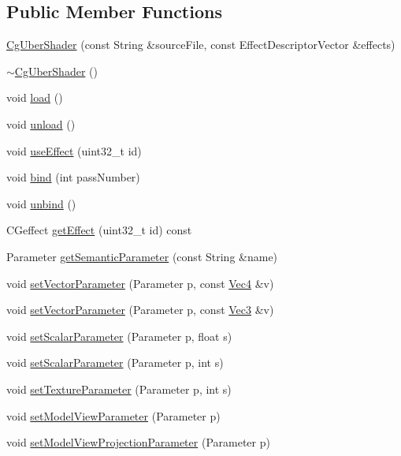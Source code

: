 \subsection*{\-Public \-Member \-Functions}
\begin{DoxyCompactItemize}
\item 
\hyperlink{class_verdi_1_1_cg_uber_shader_a5e966004208914c321d13682dbf46e7f}{\-Cg\-Uber\-Shader} (const \-String \&source\-File, const \-Effect\-Descriptor\-Vector \&effects)
\item 
\hyperlink{class_verdi_1_1_cg_uber_shader_a5a017eafea523d5d8a9d367590eca6c9}{$\sim$\-Cg\-Uber\-Shader} ()
\item 
void \hyperlink{class_verdi_1_1_cg_uber_shader_a6b645a552cac4f146317e952e63a6983}{load} ()
\item 
void \hyperlink{class_verdi_1_1_cg_uber_shader_a7c9cb2b6be590a8ba8403966c18c0224}{unload} ()
\item 
void \hyperlink{class_verdi_1_1_cg_uber_shader_a6d6ce6cfd0ac5184d3080d28e6acee5a}{use\-Effect} (uint32\-\_\-t id)
\item 
void \hyperlink{class_verdi_1_1_cg_uber_shader_a0fcb4b251642e47d9cddf8b953077ca9}{bind} (int pass\-Number)
\item 
void \hyperlink{class_verdi_1_1_cg_uber_shader_a59c11b258e21b727b1f9c1f97a82d92d}{unbind} ()
\item 
\-C\-Geffect \hyperlink{class_verdi_1_1_cg_uber_shader_a00bc3ed3a3a2487e98d2ed4a870c71d1}{get\-Effect} (uint32\-\_\-t id) const 
\item 
\-Parameter \hyperlink{class_verdi_1_1_cg_uber_shader_acb88799a32d8ffb579394672ca5476e9}{get\-Semantic\-Parameter} (const \-String \&name)
\item 
void \hyperlink{class_verdi_1_1_cg_uber_shader_a5f26603c60f105b32b29c459fbded251}{set\-Vector\-Parameter} (\-Parameter p, const \hyperlink{class_verdi_1_1_vec4}{\-Vec4} \&v)
\item 
void \hyperlink{class_verdi_1_1_cg_uber_shader_acb5142e56a6cc919560bcd847f3fceb9}{set\-Vector\-Parameter} (\-Parameter p, const \hyperlink{class_verdi_1_1_vec3}{\-Vec3} \&v)
\item 
void \hyperlink{class_verdi_1_1_cg_uber_shader_ab039ed93cb6a6aac6cda3dbb9287f46b}{set\-Scalar\-Parameter} (\-Parameter p, float s)
\item 
void \hyperlink{class_verdi_1_1_cg_uber_shader_a210df3e0d883476cbe421a310182e6d5}{set\-Scalar\-Parameter} (\-Parameter p, int s)
\item 
void \hyperlink{class_verdi_1_1_cg_uber_shader_aefa6e362c935963373c5561f41374d87}{set\-Texture\-Parameter} (\-Parameter p, int s)
\item 
void \hyperlink{class_verdi_1_1_cg_uber_shader_a2eaaa9111fe8cf0408100de8663f2be0}{set\-Model\-View\-Parameter} (\-Parameter p)
\item 
void \hyperlink{class_verdi_1_1_cg_uber_shader_a60da289f550216f9d8c228b48e946d42}{set\-Model\-View\-Projection\-Parameter} (\-Parameter p)
\end{DoxyCompactItemize}
